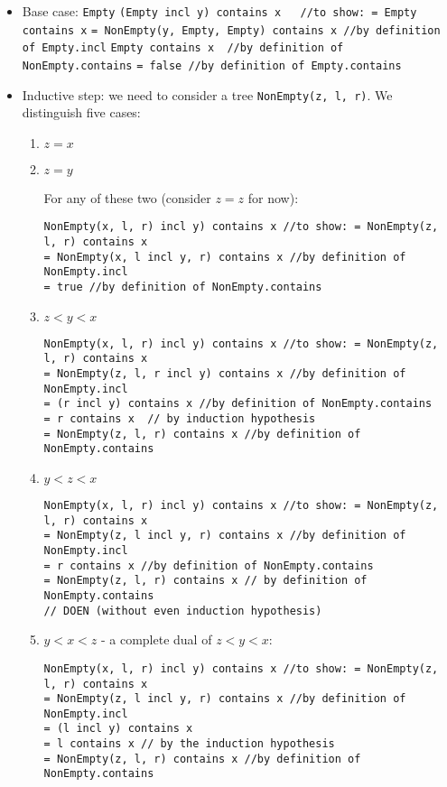 \documentclass{scrartcl}
\begin{document}
\begin{itemize}
\item Base case: \lstinline|Empty|
\lstinline|(Empty incl y) contains x   //to show: = Empty contains x|
\lstinline|= NonEmpty(y, Empty, Empty) contains x //by definition of Empty.incl|
\lstinline|Empty contains x  //by definition of NonEmpty.contains|
\lstinline|= false //by definition of Empty.contains|


\item Inductive step: we need to consider a tree \lstinline|NonEmpty(z, l, r)|.
  We distinguish five cases:
  \begin{enumerate}
  \item $z = x$
  \item $z = y$

    For any of these two (consider $z = z$ for now):
\begin{lstlisting}
NonEmpty(x, l, r) incl y) contains x //to show: = NonEmpty(z, l, r) contains x
= NonEmpty(x, l incl y, r) contains x //by definition of NonEmpty.incl
= true //by definition of NonEmpty.contains
\end{lstlisting}

  \item $z < y < x$
\begin{lstlisting}
NonEmpty(x, l, r) incl y) contains x //to show: = NonEmpty(z, l, r) contains x
= NonEmpty(z, l, r incl y) contains x //by definition of NonEmpty.incl
= (r incl y) contains x //by definition of NonEmpty.contains
= r contains x  // by induction hypothesis
= NonEmpty(z, l, r) contains x //by definition of NonEmpty.contains
\end{lstlisting}
  \item $y < z < x$
\begin{lstlisting}
NonEmpty(x, l, r) incl y) contains x //to show: = NonEmpty(z, l, r) contains x
= NonEmpty(z, l incl y, r) contains x //by definition of NonEmpty.incl
= r contains x //by definition of NonEmpty.contains
= NonEmpty(z, l, r) contains x // by definition of NonEmpty.contains 
// DOEN (without even induction hypothesis)
\end{lstlisting}
  \item $y < x < z$ - a complete dual of $z < y < x$:
\begin{lstlisting}
NonEmpty(x, l, r) incl y) contains x //to show: = NonEmpty(z, l, r) contains x
= NonEmpty(z, l incl y, r) contains x //by definition of NonEmpty.incl
= (l incl y) contains x 
= l contains x // by the induction hypothesis
= NonEmpty(z, l, r) contains x //by definition of NonEmpty.contains
\end{lstlisting}
  \end{enumerate}


\end{itemize}
\end{document}
